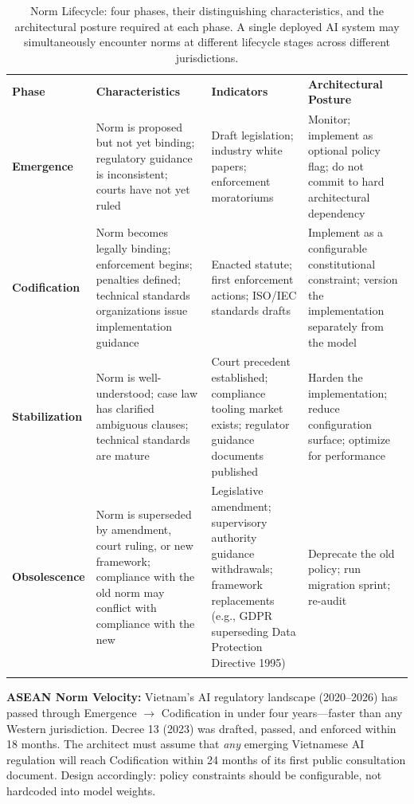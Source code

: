 \begin{table}[ht]
\centering
\caption{Norm Lifecycle: four phases, their distinguishing characteristics, and the architectural posture required at each phase. A single deployed AI system may simultaneously encounter norms at different lifecycle stages across different jurisdictions.}
\label{tab:norm_lifecycle}
\renewcommand{\arraystretch}{1.35}
\begin{tabular}{p{2.2cm} p{3.0cm} p{3.5cm} p{4.0cm}}
\hline\noalign{\smallskip}
\textbf{Phase} & \textbf{Characteristics} & \textbf{Indicators} & \textbf{Architectural Posture} \\
\noalign{\smallskip}\svhline\noalign{\smallskip}
\textbf{Emergence} & Norm is proposed but not yet binding; regulatory guidance is inconsistent; courts have not yet ruled & Draft legislation; industry white papers; enforcement moratoriums & Monitor; implement as optional policy flag; do not commit to hard architectural dependency \\[5pt]
\textbf{Codification} & Norm becomes legally binding; enforcement begins; penalties defined; technical standards organizations issue implementation guidance & Enacted statute; first enforcement actions; ISO/IEC standards drafts & Implement as a configurable constitutional constraint; version the implementation separately from the model \\[5pt]
\textbf{Stabilization} & Norm is well-understood; case law has clarified ambiguous clauses; technical standards are mature & Court precedent established; compliance tooling market exists; regulator guidance documents published & Harden the implementation; reduce configuration surface; optimize for performance \\[5pt]
\textbf{Obsolescence} & Norm is superseded by amendment, court ruling, or new framework; compliance with the old norm may conflict with compliance with the new & Legislative amendment; supervisory authority guidance withdrawals; framework replacements (e.g., GDPR superseding Data Protection Directive 1995) & Deprecate the old policy; run migration sprint; re-audit \\
\noalign{\smallskip}\hline\noalign{\smallskip}
\end{tabular}
\end{table}

\begin{svgraybox}
\textbf{ASEAN Norm Velocity:} Vietnam's AI regulatory landscape (2020--2026) has passed through Emergence $\to$ Codification in under four years---faster than any Western jurisdiction. Decree 13 (2023) was drafted, passed, and enforced within 18 months. The architect must assume that \emph{any} emerging Vietnamese AI regulation will reach Codification within 24 months of its first public consultation document. Design accordingly: policy constraints should be configurable, not hardcoded into model weights.
\end{svgraybox}

